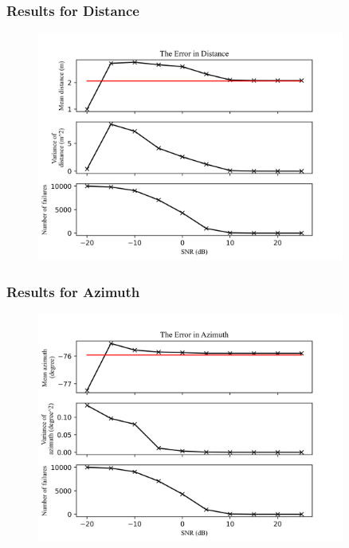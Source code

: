 \documentclass{beamer}
\begin{document}
\begin{frame}
\frametitle{Results for Distance}

\begin{figure}[H]
\includegraphics[width=0.9\textwidth]{../Python/pyramid_robot/noise_distance.png}
\centering
\end{figure}

\end{frame}

\begin{frame}
\frametitle{Results for Azimuth}

\begin{figure}[H]
\includegraphics[width=0.9\textwidth]{../Python/pyramid_robot/noise_azimuth.png}
\centering
\end{figure}

\end{frame}
\end{document}
